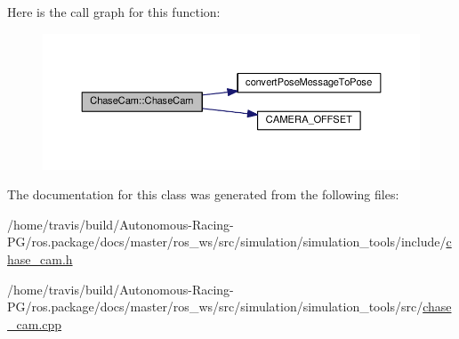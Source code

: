 Here is the call graph for this function\+:
\nopagebreak
\begin{figure}[H]
\begin{center}
\leavevmode
\includegraphics[width=350pt]{class_chase_cam_acaf9b819000bb346ebd85aa372782295_cgraph}
\end{center}
\end{figure}




The documentation for this class was generated from the following files\+:\begin{DoxyCompactItemize}
\item 
/home/travis/build/\+Autonomous-\/\+Racing-\/\+P\+G/ros.\+package/docs/master/ros\+\_\+ws/src/simulation/simulation\+\_\+tools/include/\hyperlink{chase__cam_8h}{chase\+\_\+cam.\+h}\item 
/home/travis/build/\+Autonomous-\/\+Racing-\/\+P\+G/ros.\+package/docs/master/ros\+\_\+ws/src/simulation/simulation\+\_\+tools/src/\hyperlink{chase__cam_8cpp}{chase\+\_\+cam.\+cpp}\end{DoxyCompactItemize}
